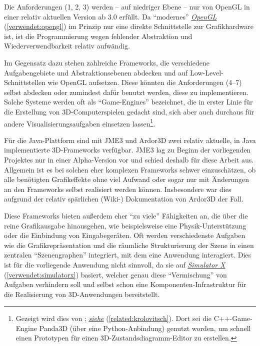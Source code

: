 \documentclass[a4paper,10pt]{sphinxmanual}
\begin{document}
Die Anforderungen (1, 2, 3) werden – auf niedriger Ebene – nur von OpenGL in einer relativ aktuellen Version ab 3.0 erfüllt.
Da "`modernes"' {\hyperref[verwendet:opengl]{\emph{OpenGL}}} (\autoref*{verwendet:opengl}) im Prinzip nur eine direkte Schnittstelle zur Grafikhardware ist, ist die Programmierung wegen fehlender Abstraktion und Wiederverwendbarkeit relativ aufwändig.

Im Gegensatz dazu stehen zahlreiche Frameworks, die verschiedene Aufgabengebiete und Abstraktionsebenen abdecken und auf Low-Level-Schnittstellen wie OpenGL aufsetzen.
Diese könnten die Anforderungen (4–7) selbst abdecken oder zumindest dafür benutzt werden, diese zu implementieren.
Solche Systeme werden oft als "`Game-Engines"' bezeichnet, die in erster Linie für die Erstellung von 3D-Computerspielen gedacht sind, sich aber auch durchaus für andere Visualisierungsaufgaben einsetzen lassen\footnote{
Gezeigt wird dies von \cite{alvergren_3d_2009}; {\hyperref[related:krolovitsch]{\emph{siehe}}} (\autoref*{related:krolovitsch}). Dort sei die C++-Game-Engine Panda3D (über eine Python-Anbindung) genutzt worden, um schnell einen Prototypen für einen 3D-Zustandsdiagramm-Editor zu erstellen.
}.

Für die Java-Plattform sind mit JME3 und Ardor3D zwei relativ aktuelle, in Java implementierte 3D-Frameworks verfügbar.
JME3 lag zu Beginn der vorliegenden Projektes nur in einer Alpha-Version vor und schied deshalb für diese Arbeit aus.
Allgemein ist es bei solchen eher komplexen Frameworks schwer einzuschätzen, ob alle benötigten Grafikeffekte ohne viel Aufwand oder sogar nur mit Änderungen an den Frameworks selbst realisiert werden können.
Insbesondere war dies aufgrund der relativ spärlichen (Wiki-) Dokumentation von Ardor3D der Fall.

Diese Frameworks bieten außerdem eher "`zu viele"' Fähigkeiten an, die über die reine Grafikausgabe hinausgehen, wie beispielsweise eine Physik-Unterstützung oder die Einbindung von Eingabegeräten.
Oft werden verschiedenste Aufgaben wie die Grafikrepräsentation und die räumliche Strukturierung der Szene in einen zentralen "`Szenengraphen"' integriert, mit dem eine Anwendung interagiert.
Dies ist für die vorliegende Anwendung nicht sinnvoll, da sie auf {\hyperref[verwendet:simulatorx]{\emph{Simulator X}}} (\autoref*{verwendet:simulatorx}) basiert, welcher genau diese "`Vermischung"' von Aufgaben verhindern soll und selbst schon eine Komponenten-Infrastruktur für die Realisierung von 3D-Anwendungen bereitstellt.
\end{document}
